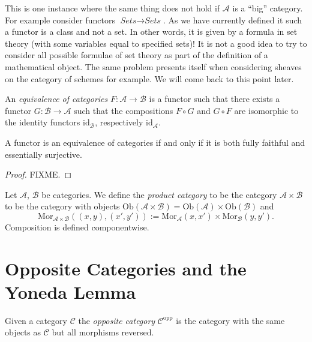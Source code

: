 \begin{remark}
This is one instance where the same thing does not hold if
$\mathcal{A}$ is a ``big'' category. For example consider
functors $\textit{Sets} \to \textit{Sets}$. As we have currently
defined it such a functor is a class and not a set. In other
words, it is given by a formula in set theory (with some variables
equal to specified sets)! It is not a good idea to try to consider
all possible formulae of set theory as part of the definition of 
a mathematical object. The same problem presents itself when
considering sheaves on the category of schemes for example.
We will come back to this point later.
\end{remark}

\begin{definition}
\label{definiton-equivalence-categories}
An {\it equivalence of categories}
$F : \mathcal{A} \to \mathcal{B}$ is a functor such that there
exists a functor $G : \mathcal{B} \to \mathcal{A}$ such that
the compositions $F \circ G$ and $G \circ F$ are isomorphic to the
identity functors $\text{id}_\mathcal{B}$,
respectively $\text{id}_\mathcal{A}$.
\end{definition}

\begin{lemma}
A functor is an equivalence of categories if and only if it is both fully
faithful and essentially surjective.
\end{lemma}

\begin{proof} FIXME. \end{proof}

\begin{definition}
\label{definition-product-category}
Let $\mathcal{A}$, $\mathcal{B}$ be categories.
We define the {\it product category} to be the category
$\mathcal{A}\times \mathcal{B}$ to be the category with
objects
$\text{Ob}(\mathcal{A}\times \mathcal{B}) =
\text{Ob}(\mathcal{A}) \times \text{Ob}(\mathcal{B})$
and 
$$
\text{Mor}_{\mathcal{A}\times \mathcal{B}}((x,y), (x',y'))
:=
\text{Mor}_{\mathcal{A}}(x, x')\times
\text{Mor}_{\mathcal{B}}(y, y').
$$
Composition is defined componentwise.
\end{definition}


\section{Opposite Categories and the Yoneda Lemma}
\label{section-opposite}

\begin{definition}
\label{definition-opposite}
Given a category $\mathcal{C}$ the {\it opposite category}
$\mathcal{C}^{\text{opp}}$ is the category with the same objects
as $\mathcal{C}$ but all morphisms reversed.
\end{definition}

